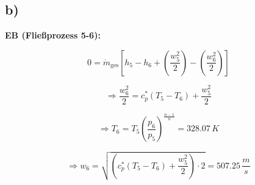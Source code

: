 

\subsection*{b)}

\textbf{EB (Fließprozess 5-6):}

\[
0 = \dot{m}_{\text{ges}} \left[ h_5 - h_6 + \left( \frac{w_5^2}{2} \right) - \left( \frac{w_6^2}{2} \right) \right]
\]

\[
\Rightarrow \frac{w_6^2}{2} = c_p^* (T_5 - T_6) + \frac{w_5^2}{2}
\]

\[
\Rightarrow T_6 = T_5 \left( \frac{p_6}{p_5} \right)^{\frac{n-1}{n}} = 328.07 \, K
\]

\[
\Rightarrow w_6 = \sqrt{ \left( c_p^* (T_5 - T_6) + \frac{w_5^2}{2} \right) \cdot 2 } = 507.25 \, \frac{m}{s}
\]